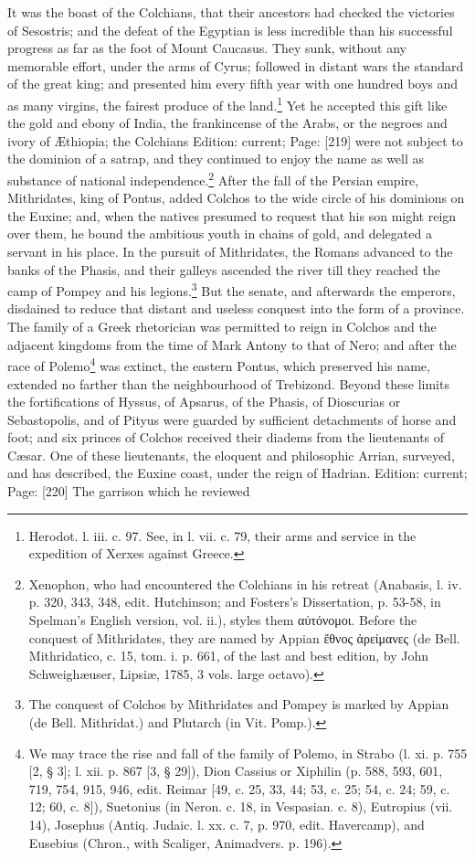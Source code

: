 It was the boast of the Colchians, that their ancestors had checked the victories of Sesostris; and the defeat of the Egyptian is less incredible than his successful progress as far as the foot of Mount Caucasus. They sunk, without any memorable effort, under the arms of Cyrus; followed in distant wars the standard of the great king; and presented him every fifth year with one hundred boys and as many virgins, the fairest produce of the land.\footnote{Herodot. l. iii. c. 97. See, in l. vii. c. 79, their arms and service in the expedition of Xerxes against Greece.} Yet he accepted this gift like the gold and ebony of India, the frankincense of the Arabs, or the negroes and ivory of Æthiopia; the Colchians Edition: current; Page: [219] were not subject to the dominion of a satrap, and they continued to enjoy the name as well as substance of national independence.\footnote{Xenophon, who had encountered the Colchians in his retreat (Anabasis, l. iv. p. 320, 343, 348, edit. Hutchinson; and Fosters\texthebrew{}’s Dissertation, p. 53-58, in Spelman\texthebrew{}’s English version, vol. ii.), styles them \textgreek{α\texthebrew{ὐ}τόνομοι}. Before the conquest of Mithridates, they are named by Appian \textgreek{\texthebrew{ἔ}θνος \texthebrew{ἀ}ρείμανες} (de Bell. Mithridatico, c. 15, tom. i. p. 661, of the last and best edition, by John Schweighæuser, Lipsiæ, 1785, 3 vols. large octavo).} After the fall of the Persian empire, Mithridates, king of Pontus, added Colchos to the wide circle of his dominions on the Euxine; and, when the natives presumed to request that his son might reign over them, he bound the ambitious youth in chains of gold, and delegated a servant in his place. In the pursuit of Mithridates, the Romans advanced to the banks of the Phasis, and their galleys ascended the river till they reached the camp of Pompey and his legions.\footnote{The conquest of Colchos by Mithridates and Pompey is marked by Appian (de Bell. Mithridat.) and Plutarch (in Vit. Pomp.).} But the senate, and afterwards the emperors, disdained to reduce that distant and useless conquest into the form of a province. The family of a Greek rhetorician was permitted to reign in Colchos and the adjacent kingdoms from the time of Mark Antony to that of Nero; and after the race of Polemo\footnote{We may trace the rise and fall of the family of Polemo, in Strabo (l. xi. p. 755 [2, § 3]; l. xii. p. 867 [3, § 29]), Dion Cassius or Xiphilin (p. 588, 593, 601, 719, 754, 915, 946, edit. Reimar [49, c. 25, 33, 44; 53, c. 25; 54, c. 24; 59, c. 12; 60, c. 8]), Suetonius (in Neron. c. 18, in Vespasian. c. 8), Eutropius (vii. 14), Josephus (Antiq. Judaic. l. xx. c. 7, p. 970, edit. Havercamp), and Eusebius (Chron., with Scaliger, Animadvers. p. 196).} was extinct, the eastern Pontus, which preserved his name, extended no farther than the neighbourhood of Trebizond. Beyond these limits the fortifications of Hyssus, of Apsarus, of the Phasis, of Dioscurias or Sebastopolis, and of Pityus were guarded by sufficient detachments of horse and foot; and six princes of Colchos received their diadems from the lieutenants of Cæsar. One of these lieutenants, the eloquent and philosophic Arrian, surveyed, and has described, the Euxine coast, under the reign of Hadrian. Edition: current; Page: [220] The garrison which he reviewed 